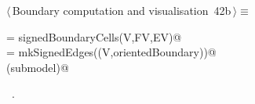 \documentclass[11pt,oneside]{article}	%
\begin{document}
\begin{flushleft} \small \label{scrap90}
\protect{}$\langle\,$Boundary computation and visualisation\nobreak\ {\footnotesize 42b}$\,\rangle\equiv$
\vspace{-1ex}
\begin{list}{}{} \item
\mbox{}\verb@orientedBoundary = signedBoundaryCells(V,FV,EV)@\\
\mbox{}\verb@submodel = mkSignedEdges((V,orientedBoundary))@\\
\mbox{}\verb@VIEW(submodel)@\\
\mbox{}\verb@@{\NWsep}
\end{list}
\vspace{-1ex}
\footnotesize\addtolength{\baselineskip}{-1ex}
\begin{list}{}{\setlength{\itemsep}{-\parsep}\setlength{\itemindent}{-\leftmargin}}
\item \NWtxtMacroRefIn\ .
\end{list}
\end{flushleft}
\end{document}
